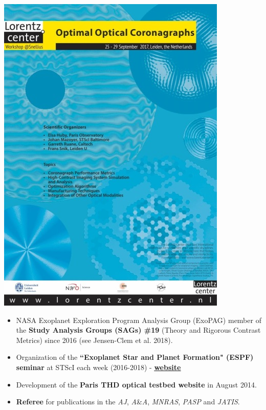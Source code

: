 \documentclass[12pt]{article}
\begin{document}
\parbox{0.43\linewidth}{
\vspace{-0.8cm}
\begin{mybox}
    \includegraphics[width=1.\textwidth]{figures_CV/ooc_poster2_sm.jpg}
 \end{mybox}
}



\begin{itemize}
    \item \small NASA Exoplanet Exploration Program Analysis Group (ExoPAG) member of the \textbf{Study Analysis Groups (SAGs) \#19} (Theory and Rigorous Contrast Metrics) since 2016 (see Jensen-Clem et al. 2018).
    \item \small Organization of the \textbf{``Exoplanet Star and Planet Formation" (ESPF) seminar} at STScI each week (2016-2018) - \href{https://sites.google.com/site/starandplanetformationseries/}{\underline{\textbf{website}}}
    \item \small Development of the \textbf{Paris THD optical testbed website} in August 2014.
    \item \small \textbf{Referee} for publications in the \textit{AJ}, \textit{A}\&\textit{A}, \textit{MNRAS}, \textit{PASP} and \textit{JATIS}.
\end{itemize}
\end{document}

